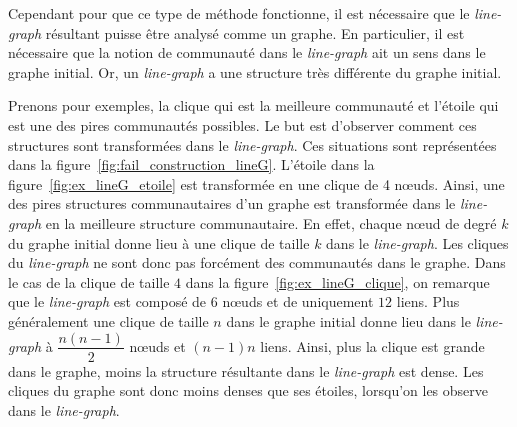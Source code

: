 Cependant pour que ce type de méthode fonctionne, il est nécessaire que le \emph{line-graph} résultant puisse être analysé comme un graphe.
En particulier, il est nécessaire que la notion de communauté dans le \emph{line-graph} ait un sens dans le graphe initial.
Or, un \emph{line-graph} a une structure très différente du graphe initial.


Prenons pour exemples, la clique qui est la meilleure communauté et l'étoile qui est une des pires communautés possibles.
Le but est d'observer comment ces structures sont transformées dans le \emph{line-graph}.
Ces situations sont représentées dans la figure~\ref{fig:fail_construction_lineG}.
L'étoile dans la figure~\ref{fig:ex_lineG_etoile} est transformée en une clique de 4 n\oe{}uds.
Ainsi, une des pires structures communautaires d'un graphe est transformée dans le \emph{line-graph} en la meilleure structure communautaire.
En effet, chaque n\oe{}ud de degré $k$ du graphe initial donne lieu à une clique de taille $k$ dans le \emph{line-graph}.
Les cliques du \emph{line-graph} ne sont donc pas forcément des communautés dans le graphe.
Dans le cas de la clique de taille $4$ dans la figure~\ref{fig:ex_lineG_clique}, on remarque que le \emph{line-graph} est composé de $6$ n\oe{}uds et de uniquement $12$ liens.
Plus généralement une clique de taille $n$ dans le graphe initial donne lieu dans le \emph{line-graph} à $\dfrac{n(n-1)}{2}$ n\oe{}uds et $(n-1)n$ liens.
Ainsi, plus la clique est grande dans le graphe, moins la structure résultante dans le \emph{line-graph} est dense.
Les cliques du graphe sont donc moins denses que ses étoiles, lorsqu'on les observe dans le \emph{line-graph}.

